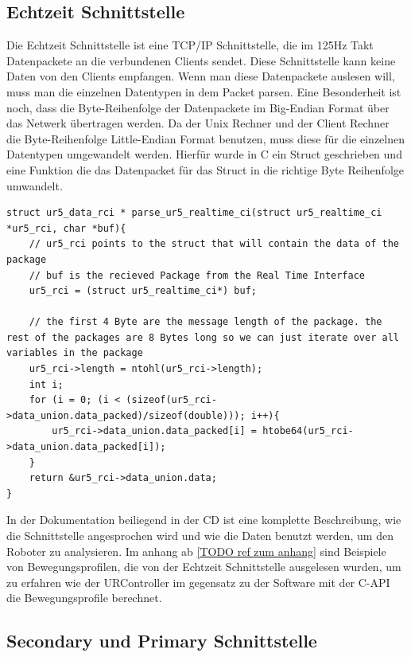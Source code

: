 \subsection{Echtzeit Schnittstelle}
\label{urcontrol_rci_gru}

Die Echtzeit Schnittstelle ist eine \acs{TCP/IP} Schnittstelle, die im 125Hz Takt Datenpackete an die verbundenen Clients sendet. Diese Schnittstelle kann keine Daten von den Clients empfangen. Wenn man diese Datenpackete auslesen will, muss man die einzelnen Datentypen in dem Packet \acs{parsen}. Eine Besonderheit ist noch, dass die Byte-Reihenfolge der Datenpackete im \acs{Big-Endian Format} über das Netwerk übertragen werden. Da der Unix Rechner und der Client Rechner die Byte-Reihenfolge \acs{Little-Endian Format} benutzen, muss diese für die einzelnen Datentypen umgewandelt werden. Hierfür wurde in C ein Struct geschrieben und eine Funktion die das Datenpacket für das Struct in die richtige Byte Reihenfolge umwandelt.

\begin{lstlisting}[caption={Umwandlung der Byte-Order für Packet über die Echtzeit-Schnittstellen }, label=lst:rci_parse ,captionpos=b]
struct ur5_data_rci * parse_ur5_realtime_ci(struct ur5_realtime_ci *ur5_rci, char *buf){
    // ur5_rci points to the struct that will contain the data of the package
    // buf is the recieved Package from the Real Time Interface
    ur5_rci = (struct ur5_realtime_ci*) buf;

    // the first 4 Byte are the message length of the package. the rest of the packages are 8 Bytes long so we can just iterate over all variables in the package 
    ur5_rci->length = ntohl(ur5_rci->length);
    int i;
    for (i = 0; (i < (sizeof(ur5_rci->data_union.data_packed)/sizeof(double))); i++){
        ur5_rci->data_union.data_packed[i] = htobe64(ur5_rci->data_union.data_packed[i]);
    }
    return &ur5_rci->data_union.data;
}
\end{lstlisting}

In der Dokumentation beiliegend in der CD ist eine komplette Beschreibung, wie die Schnittstelle angesprochen wird und wie die Daten benutzt werden, um den Roboter zu analysieren. Im anhang ab \ref{TODO ref zum anhang} sind Beispiele von Bewegungsprofilen, die von der Echtzeit Schnittstelle ausgelesen wurden, um zu erfahren wie der URController im gegensatz zu der Software mit der C-API die Bewegungsprofile berechnet.

\subsection{Secondary und Primary Schnittstelle}
\label{urcontrol_spi_gru}

